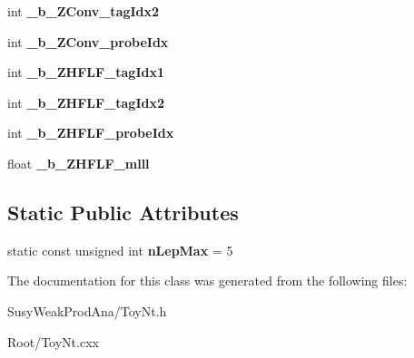\begin{DoxyCompactItemize}
\item 
\hypertarget{classToyNt_a962c255a2faa1b1fc444a2d57a8cb77a}{
int {\bfseries \_\-b\_\-ZConv\_\-tagIdx2}}
\label{classToyNt_a962c255a2faa1b1fc444a2d57a8cb77a}

\item 
\hypertarget{classToyNt_acd67dc82c3ea03e4cb532ede7391f810}{
int {\bfseries \_\-b\_\-ZConv\_\-probeIdx}}
\label{classToyNt_acd67dc82c3ea03e4cb532ede7391f810}

\item 
\hypertarget{classToyNt_a483966e9bb82edebce209097d4532608}{
int {\bfseries \_\-b\_\-ZHFLF\_\-tagIdx1}}
\label{classToyNt_a483966e9bb82edebce209097d4532608}

\item 
\hypertarget{classToyNt_a106431520c859cc798d29fc75aefc014}{
int {\bfseries \_\-b\_\-ZHFLF\_\-tagIdx2}}
\label{classToyNt_a106431520c859cc798d29fc75aefc014}

\item 
\hypertarget{classToyNt_a7f2eb8773c245e2a22a6f8732497047d}{
int {\bfseries \_\-b\_\-ZHFLF\_\-probeIdx}}
\label{classToyNt_a7f2eb8773c245e2a22a6f8732497047d}

\item 
\hypertarget{classToyNt_ad14b0eff6340bb3ca577e02e931d8fad}{
float {\bfseries \_\-b\_\-ZHFLF\_\-mlll}}
\label{classToyNt_ad14b0eff6340bb3ca577e02e931d8fad}

\end{DoxyCompactItemize}
\subsection*{Static Public Attributes}
\begin{DoxyCompactItemize}
\item 
\hypertarget{classToyNt_a307fa091dd1ccae44e90ac71b6b90f4a}{
static const unsigned int {\bfseries nLepMax} = 5}
\label{classToyNt_a307fa091dd1ccae44e90ac71b6b90f4a}

\end{DoxyCompactItemize}


The documentation for this class was generated from the following files:\begin{DoxyCompactItemize}
\item 
SusyWeakProdAna/ToyNt.h\item 
Root/ToyNt.cxx\end{DoxyCompactItemize}

